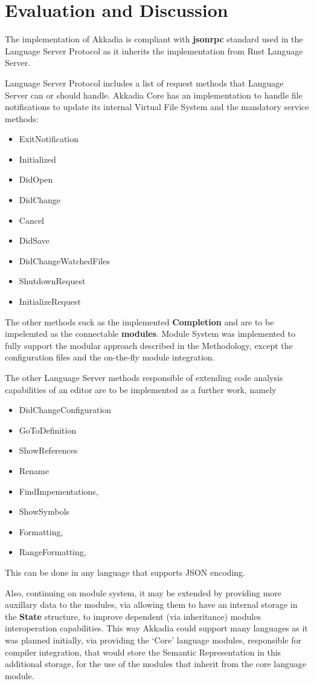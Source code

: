 \chapter{Evaluation and Discussion}
\label{chap:eval}

The implementation of Akkadia is compliant with \textbf{jsonrpc} standard
used in the Language Server Protocol as it inherits the implementation
from Rust Language Server.

Language Server Protocol includes a list of request methods that Language Server can
or should handle. Akkadia Core has an implementation to handle file notifications
to update its internal Virtual File System and the mandatory service methods:
\begin{itemize}
\item ExitNotification
\item Initialized
\item DidOpen
\item DidChange
\item Cancel
\item DidSave
\item DidChangeWatchedFiles
\item ShutdownRequest
\item InitializeRequest
\end{itemize}

The other methods suck as the implemented \textbf{Completion} and are to be impelemted
as the connectable \textbf{modules}.
Module System was implemented to fully support the modular approach described in the Methodology,
except the configuration files and the on-the-fly module integration.

The other Language Server methods responsible of extending code analysis capabilities of an editor
are to be implemented as a further work, namely
\begin{itemize}
\item DidChangeConfiguration
\item GoToDefinition
\item ShowReferences
\item Rename
\item FindImpementations,
\item ShowSymbols
\item Formatting,
\item RangeFormatting,
\end{itemize}
This can be done in any language that supports JSON encoding.

Also, continuing on module system, it may be extended by providing more auxillary data to the modules,
via allowing them to have an internal storage in the \textbf{State} structure, to improve dependent (via inheritance)
modules interoperation capabilities.
This way Akkadia could support many languages as it was planned initially, via providing the `Core' language modules,
responsible for compiler integration, that would store the Semantic Representation in this additional storage, for the use of the modules
that inherit from the core language module.

